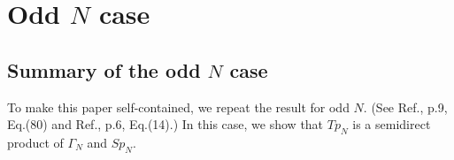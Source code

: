 \documentclass[12pt]{iopart}
\begin{document}
% 
%
%

\section{Odd \(N\) case}
\subsection{Summary of the odd \(N\) case}
To make this paper self-contained, we repeat the result for odd \(N\).
(See Ref.\cite{Appleby_2005}, p.9, Eq.(80) and Ref.\cite{Tolar_2018}, p.6, Eq.(14).)
In this case, we show that \(Tp_N\) is a semidirect product of \(\Gamma_N\) and \(Sp_N\).
\\
\end{document}
